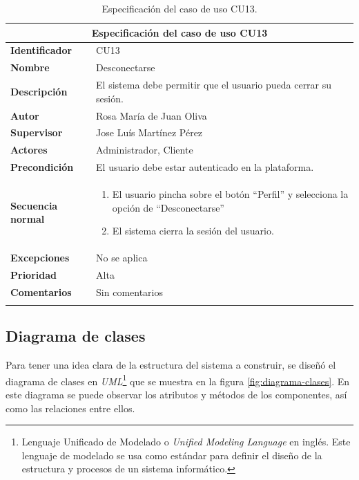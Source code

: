 \documentclass[pdftex,11pt,a4paper]{book}
\begin{document}
\begin{center}
\begin{longtable}{|m{}|m{11cm}|}
\hline
\multicolumn{2}{|c|}{\textbf{Especificación del caso de uso CU13}}\\
\hline 
\endhead

\textbf{Identificador} & CU13  
\\ \hline
\textbf{Nombre} & Desconectarse
\\ \hline
\textbf{Descripción} & El sistema debe permitir que el usuario pueda cerrar su sesión.
\\ \hline
\textbf{Autor} & Rosa María de Juan Oliva 
\\ \hline
\textbf{Supervisor} & Jose Luís Martínez Pérez  
\\ \hline
\textbf{Actores} & Administrador, Cliente
\\ \hline
\textbf{Precondición} & El usuario debe estar autenticado en la plataforma.
\\ \hline
\textbf{Secuencia normal} & 
\begin{enumerate}
\addtolength{\itemsep}{-3mm}
\item El usuario pincha sobre el botón “Perfil” y selecciona la opción de “Desconectarse”
\item El sistema cierra la sesión del usuario.
\end{enumerate}
\\ \hline
\textbf{Excepciones} & No se aplica
\\ \hline
\textbf{Prioridad} & Alta  
\\ \hline
\textbf{Comentarios} & Sin comentarios
\\ \hline

\caption{Especificación del caso de uso CU13.} \label{tablalarga:tablaCU13}
\end{longtable}
\end{center}


\newpage
\subsection{Diagrama de clases}

Para tener una idea clara de la estructura del sistema a construir, se diseñó el diagrama de clases en \textit{UML}\footnote{Lenguaje Unificado de Modelado o \textit{Unified Modeling Language} en inglés. Este lenguaje de modelado se usa como estándar para definir el diseño de la estructura y procesos de un sistema informático.\cite{bib:uml}} que se muestra en la figura \ref{fig:diagrama-clases}. En este diagrama se puede observar los atributos y métodos de los componentes, así como las relaciones entre ellos.
\end{document}
